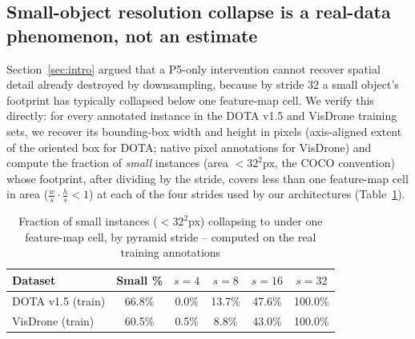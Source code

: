 \documentclass[conference]{IEEEtran}
\begin{document}
\subsection{Small-object resolution collapse is a real-data phenomenon, not an estimate}
\label{sec:theory-resolution}

Section~\ref{sec:intro} argued that a P5-only intervention cannot recover
spatial detail already destroyed by downsampling, because by stride 32 a
small object's footprint has typically collapsed below one feature-map
cell. We verify this directly: for every annotated instance in the DOTA
v1.5 and VisDrone training sets, we recover its bounding-box width and
height in pixels (axis-aligned extent of the oriented box for DOTA; native
pixel annotations for VisDrone) and compute the fraction of
\emph{small} instances (area $<32^2$px, the COCO convention) whose
footprint, after dividing by the stride, covers less than one feature-map
cell in area ($\frac{w}{s}\cdot\frac{h}{s} < 1$) at each of the four
strides used by our architectures (Table~\ref{tab:resolution}).

\begin{table}[htbp]
\caption{Fraction of small instances ($<32^2$px) collapsing to under one
feature-map cell, by pyramid stride -- computed on the real training
annotations}
\label{tab:resolution}
\centering
\begin{tabular}{lccccc}
\toprule
Dataset & Small \% & $s{=}4$ & $s{=}8$ & $s{=}16$ & $s{=}32$ \\
\midrule
DOTA v1.5 (train)  & 66.8\% & 0.0\%  & 13.7\% & 47.6\%  & 100.0\% \\
VisDrone (train)   & 60.5\% & 0.5\%  & 8.8\%  & 43.0\%  & 100.0\% \\
\bottomrule
\end{tabular}
\end{table}
\end{document}
